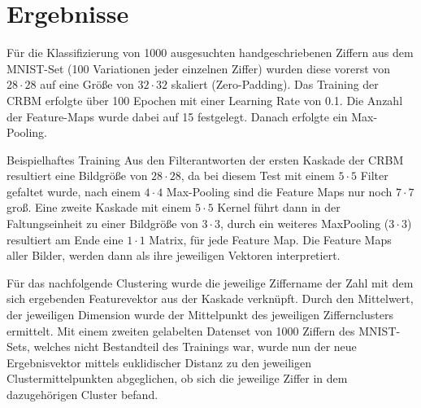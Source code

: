 \section{Ergebnisse}\label{results}
Für die Klassifizierung von 1000 ausgesuchten handgeschriebenen Ziffern aus dem MNIST-Set (100 Variationen jeder einzelnen Ziffer) wurden diese vorerst von $28 \cdot 28$ auf eine Größe von $32 \cdot 32$ skaliert (Zero-Padding). Das Training der CRBM erfolgte über 100 Epochen mit einer Learning Rate von 0.1. Die Anzahl der Feature-Maps wurde dabei auf 15 festgelegt.
Danach erfolgte ein Max-Pooling. 
\newline 

Beispielhaftes Training
Aus den Filterantworten der ersten Kaskade der CRBM resultiert eine Bildgröße von $28 \cdot 28$, da bei diesem Test mit einem $5 \cdot 5$ Filter gefaltet wurde, nach einem $4 \cdot 4$ Max-Pooling sind die Feature Maps nur noch $7 \cdot 7$ groß. Eine zweite Kaskade mit einem  $5 \cdot 5$ Kernel führt dann in der Faltungseinheit zu einer Bildgröße von $3 \cdot 3$, durch ein weiteres MaxPooling ($3 \cdot 3$) resultiert am Ende eine $1 \cdot 1$ Matrix, für jede Feature Map. Die Feature Maps aller Bilder, werden dann als ihre jeweiligen Vektoren interpretiert.

Für das nachfolgende Clustering wurde die jeweilige Ziffername der Zahl mit dem sich ergebenden Featurevektor aus der Kaskade verknüpft. Durch den Mittelwert, der jeweiligen Dimension wurde der Mittelpunkt des jeweiligen Ziffernclusters ermittelt.
Mit einem zweiten gelabelten Datenset von 1000 Ziffern des MNIST-Sets, welches nicht Bestandteil des Trainings war, wurde nun der neue Ergebnisvektor mittels euklidischer Distanz zu den jeweiligen Clustermittelpunkten abgeglichen, ob sich die jeweilige Ziffer in dem dazugehörigen Cluster befand.